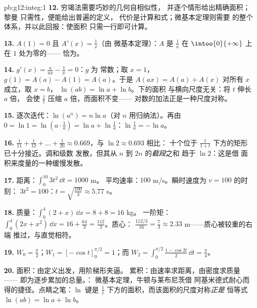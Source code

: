 \begin{solution}{pb:g12:integ:1}
\textbf{12.} 穷竭法需要巧妙的几何自相似性，
并逐个情形给出精确面积；黎曼
只需性，便能给出普遍的定义，
代价是计算和式；微基本定理则需要
的整个体系，并以此回报：使面积
只需一行即可计算。

\textbf{13.} $A(1) = 0$ 且 $A'(x) = \frac1x$（由
微基本定理）：$A$ 是 $\frac1x$ 在
$\intoo{0}{+\infty}$ 上在 $1$ 处为零的——
恰为。

\textbf{14.} $g'(x) = \frac{a}{ax} - \frac1x = 0$：$g$ 为
常数；取 $x = 1$，$g(1) = A(a) - A(1) = A(a)$。于是
$A(ax) = A(a) + A(x)$ 对所有 $x$ 成立，取 $x = b$，
$\ln(ab) = \ln a + \ln b$。下的面积
与横向尺度无关：将 $t$ 伸长 $a$ 倍，
会使 $\frac1t$ 压缩 $a$ 倍，而面积不变——
对数的加法正是一种尺度对称。

\textbf{15.} 逐次迭代：$\ln(a^n) = n\ln a$（对
$n$ 用归纳法）。再由 $0 = \ln 1 = \ln\left(a \cdot \frac1a\right) =
\ln a + \ln\frac1a$：$\ln\frac1a = -\ln a$。

\textbf{16.} $\frac{1}{11} + \frac{1}{12} + \dots +
\frac{1}{20} \approx 0.669$，与 $\ln 2 \approx 0.693$ 相比：
十个位于 $\frac{1}{1+t}$ 下方的矩形已十分接近。调和级数
发散，但其从 $n$ 到 $2n$ 的\emph{截段}之和
趋于 $\ln 2$：这是借
面积来度量的一种缓慢发散。

\textbf{17.} 距离：$\int_0^{10} 3t^2\,\dd t = 1000$ m。
平均速率：$100$ m/s。瞬时速度为 $v = 100$ 的时刻：
$3t^2 = 100$：$t = \sqrt{\frac{100}{3}} \approx 5.77$ s。

\textbf{18.} 质量：$\int_0^4 (2 + x)\,\dd x = 8 + 8 = 16$ kg。
一阶矩：$\int_0^4 (2x + x^2)\,\dd x = 16 + \frac{64}{3} =
\frac{112}{3}$。质心：
$\frac{112/3}{16} = \frac73 \approx 2.33$ m——质心被较重的右端
推过，与直觉相符。

\textbf{19.} $W_0 = \frac\pi2$；$W_1 = \left[-\cos
t\right]_0^{\pi/2} = 1$；而
$W_2 = \int_0^{\pi/2} \frac{1 - \cos 2t}{2}\,\dd t =
\frac\pi4$。

\textbf{20.} 面积：由定义出发，用阶梯形夹逼。
累积：由速率求距离，由密度求质量——
即为逐步累加的总量。：
微基本定理，牛顿与莱布尼茨借
阿基米德式耐心而得的捷径。点睛之笔：$\ln$ 键是
$\frac1t$ 下方的面积，而该面积的尺度对称\emph{正是}
恒等式 $\ln(ab) = \ln a + \ln b$。
\end{solution}

